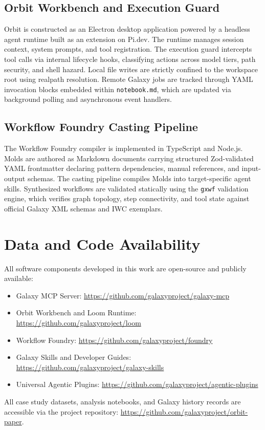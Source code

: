 \documentclass[11pt,letterpaper]{article}
\begin{document}
\subsection*{Orbit Workbench and Execution Guard}
Orbit is constructed as an Electron desktop application powered by a headless agent runtime built as an extension on Pi.dev. The runtime manages session context, system prompts, and tool registration. The execution guard intercepts tool calls via internal lifecycle hooks, classifying actions across model tiers, path security, and shell hazard. Local file writes are strictly confined to the workspace root using realpath resolution. Remote Galaxy jobs are tracked through YAML invocation blocks embedded within \texttt{notebook.md}, which are updated via background polling and asynchronous event handlers.

\subsection*{Workflow Foundry Casting Pipeline}
The Workflow Foundry compiler is implemented in TypeScript and Node.js. Molds are authored as Markdown documents carrying structured Zod-validated YAML frontmatter declaring pattern dependencies, manual references, and input-output schemas. The casting pipeline compiles Molds into target-specific agent skills. Synthesized workflows are validated statically using the \texttt{gxwf} validation engine, which verifies graph topology, step connectivity, and tool state against official Galaxy XML schemas and IWC exemplars.

\section*{Data and Code Availability}
All software components developed in this work are open-source and publicly available:
\begin{itemize}
    \item Galaxy MCP Server: \url{https://github.com/galaxyproject/galaxy-mcp}
    \item Orbit Workbench and Loom Runtime: \url{https://github.com/galaxyproject/loom}
    \item Workflow Foundry: \url{https://github.com/galaxyproject/foundry}
    \item Galaxy Skills and Developer Guides: \url{https://github.com/galaxyproject/galaxy-skills}
    \item Universal Agentic Plugins: \url{https://github.com/galaxyproject/agentic-plugins}
\end{itemize}
All case study datasets, analysis notebooks, and Galaxy history records are accessible via the project repository: \url{https://github.com/galaxyproject/orbit-paper}.
\end{document}
